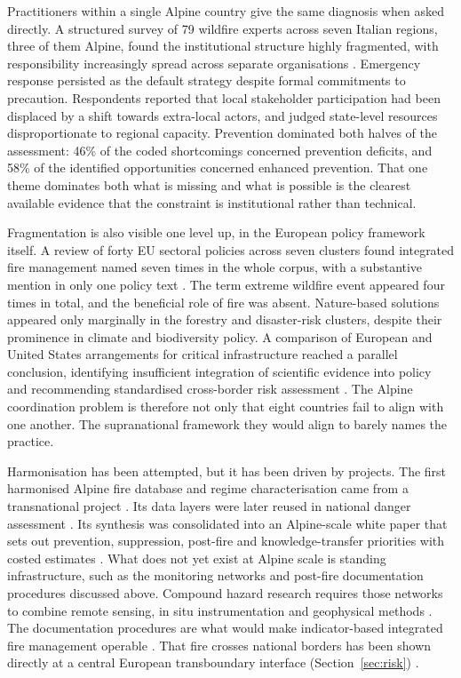 \documentclass[11pt,a4paper]{article}
\begin{document}
Practitioners within a single Alpine country give the same diagnosis when asked directly. A structured survey of 79 wildfire experts across seven Italian regions, three of them Alpine, found the institutional structure highly fragmented, with responsibility increasingly spread across separate organisations \citep{kirschner_governance_2024}. Emergency response persisted as the default strategy despite formal commitments to precaution. Respondents reported that local stakeholder participation had been displaced by a shift towards extra-local actors, and judged state-level resources disproportionate to regional capacity. Prevention dominated both halves of the assessment: 46\% of the coded shortcomings concerned prevention deficits, and 58\% of the identified opportunities concerned enhanced prevention. That one theme dominates both what is missing and what is possible is the clearest available evidence that the constraint is institutional rather than technical.

Fragmentation is also visible one level up, in the European policy framework itself. A review of forty EU sectoral policies across seven clusters found integrated fire management named seven times in the whole corpus, with a substantive mention in only one policy text \citep{plana_framing_2024}. The term extreme wildfire event appeared four times in total, and the beneficial role of fire was absent. Nature-based solutions appeared only marginally in the forestry and disaster-risk clusters, despite their prominence in climate and biodiversity policy. A comparison of European and United States arrangements for critical infrastructure reached a parallel conclusion, identifying insufficient integration of scientific evidence into policy and recommending standardised cross-border risk assessment \citep{kalapodis_towards_2025}. The Alpine coordination problem is therefore not only that eight countries fail to align with one another. The supranational framework they would align to barely names the practice.

Harmonisation has been attempted, but it has been driven by projects. The first harmonised Alpine fire database and regime characterisation came from a transnational project \citep{valese_wildfires_2011}. Its data layers were later reused in national danger assessment \citep{muller_towards_2020}. Its synthesis was consolidated into an Alpine-scale white paper that sets out prevention, suppression, post-fire and knowledge-transfer priorities with costed estimates \citep{muller_forest_2020}. What does not yet exist at Alpine scale is standing infrastructure, such as the monitoring networks and post-fire documentation procedures discussed above. Compound hazard research requires those networks to combine remote sensing, in situ instrumentation and geophysical methods \citep{baselt_compound_2026}. The documentation procedures are what would make indicator-based integrated fire management operable \citep{melzner_wildfire-induced_2025}. That fire crosses national borders has been shown directly at a central European transboundary interface (Section~\ref{sec:risk}) \citep{avouris_exposure_2025}.
\end{document}
